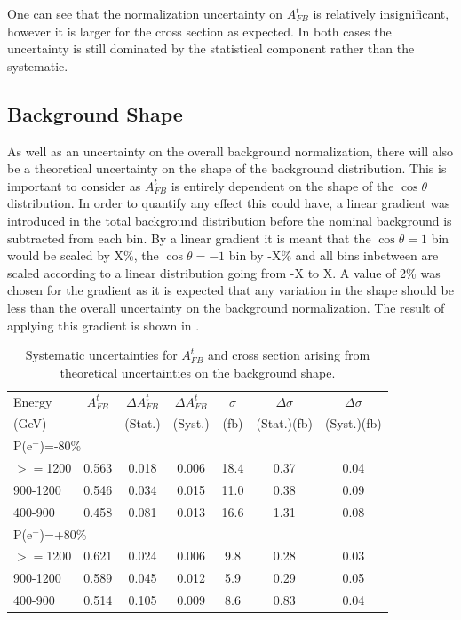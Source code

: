 One can see that the normalization uncertainty on $A_{FB}^t$ is relatively insignificant, however it is larger for the cross section as expected. In both cases the uncertainty is still dominated by the statistical component rather than the systematic.

\subsection{Background Shape}

As well as an uncertainty on the overall background normalization, there will also be a theoretical uncertainty on the shape of the background distribution. This is important to consider as $A_{FB}^t$ is entirely dependent on the shape of the $\cos\theta$ distribution. In order to quantify any effect this could have, a linear gradient was introduced in the total background distribution before the nominal background is subtracted from each bin. By a linear gradient it is meant that the $\cos\theta=1$ bin would be scaled by X\%, the $\cos\theta=-1$ bin by -X\% and all bins inbetween are scaled according to a linear distribution going from -X to X. A value of 2\% was chosen for the gradient as it is expected that any variation in the shape should be less than the overall uncertainty on the background normalization. The result of applying this gradient is shown in .

\begin{table}
  \centering
  \begin{tabular}{l|c|c|c|c|c|c}
    \toprule
     Energy & $A_{FB}^t$ & $\Delta A_{FB}^t$  & $\Delta A^t_{FB}$ &  $\sigma$  &  $\Delta\sigma$  &  $\Delta\sigma$ \\
     (GeV) &  & (Stat.) & (Syst.) &  (fb) &  (Stat.)(fb) &  (Syst.)(fb)\\
     \midrule
     \midrule
     \multicolumn{7}{l}{P(e$^-$)=-80\%} \\
     \midrule
     \midrule
    $>=$1200   & 0.563 & 0.018 & 0.006 & 18.4 & 0.37 & 0.04\\
    \midrule
    900-1200   & 0.546 & 0.034 & 0.015 & 11.0 & 0.38 & 0.09\\
    \midrule
    400-900    & 0.458 & 0.081 & 0.013 & 16.6 & 1.31 & 0.08\\
    \midrule
    \midrule
   \multicolumn{7}{l}{ P(e$^-$)=+80\%}\\
    \midrule
    \midrule
    $>=$1200  & 0.621 & 0.024 & 0.006 & 9.8 & 0.28 & 0.03 \\
    \midrule
    900-1200  & 0.589 & 0.045 & 0.012 & 5.9 & 0.29 & 0.05 \\
    \midrule
    400-900   & 0.514 & 0.105 & 0.009 & 8.6 & 0.83 & 0.04 \\
    \bottomrule
  \end{tabular}
  \caption{Systematic uncertainties for $A_{FB}^t$ and cross section arising from theoretical uncertainties on the background shape.}
  \label{tab:bkggrad}
\end{table}

